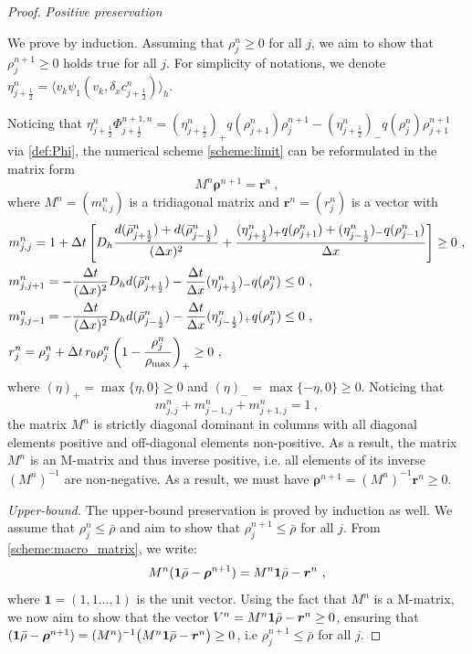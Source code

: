 \documentclass[review,onefignum,onetabnum]{siamart220329}
\newcommand {\dt}   {\Delta t}
\newcommand {\dx}   {\Delta x}
\newcommand{\brho}{\boldsymbol{\rho}}
\newcommand{\br}{\boldsymbol{r}}
\newcommand{\DP}{\color{myblue}}
\begin{document}
\begin{proof}%

\textit{Positive preservation}

We prove by induction. 
Assuming that $\rho_j^n \ge0$ for all $j$, we aim to show that $\rho_j^{n+1} \ge0$ holds true for all $j$.
For simplicity of notations, we denote $\eta_{j+\frac12}^n = \langle v_k \psi_1(v_k, \delta_x c_{j+\frac12}^n)\rangle_h$.

\noindent Noticing that $\eta_{j+\frac12}^n\Phi_{j+\frac12}^{n+1,n}=(\eta_{j+\frac12}^n)_+ q(\rho_{j+1}^n)\rho_j^{n+1} - (\eta_{j+\frac12}^n)_- q(\rho_{j}^n)\rho_{j+1}^{n+1}$ via \cref{def:Phi}, the numerical scheme \cref{scheme:limit} can be reformulated in the matrix form
\begin{equation}\label{scheme:macro_matrix}
    M^n \brho^{n+1} = \br^n\ ,
\end{equation}
where $M^n = (m_{i,j}^n)$ is a {{tridiagonal}} matrix and $\br^n = (r_j^n)$ is a vector with
\begin{align*}
    & m_{j,j}^n = 1 + \dt 
    \left[
    D_h\frac{
    d(\bar{\rho}_{j+\frac12}^n) + d(\bar{\rho}_{j-\frac12}^n)
    }{(\dx)^2} + 
    \frac{
    (\eta_{j+\frac12}^n)_+ q(\rho_{j+1}^n) + (\eta_{j-\frac12}^n)_- q(\rho_{j-1}^n)}{\dx}
    \right] \ge 0\ , \nonumber\\
    & m_{j,j+1}^n = -\frac{\dt}{(\dx)^2} D_h d(\bar{\rho}_{j+\frac12}^n) - \frac{\dt}{\dx} (\eta_{j+\frac12}^n)_- q(\rho_j^n) \le0\ , \nonumber\\
    & m_{j,j-1}^n = -\frac{\dt}{(\dx)^2} D_h d(\bar{\rho}_{j-\frac12}^n) - \frac{\dt}{\dx} (\eta_{j-\frac12}^n)_+ q(\rho_j^n)\le0\ ,\nonumber\\
    & r_j^n = \rho_j^n + \dt \, r_0 \rho_j^{n}\left(1 - \frac{\rho_j^n}{\rho_{\rm max}}\right)_+ \ge 0\ , %
\end{align*}
where $(\eta)_+ = \max\{\eta, 0\}\ge0$ and $(\eta)_-=\max\{-\eta, 0\}\ge0$.
Noticing that 
\begin{equation*}
    m_{j,j}^n + m_{j-1,j}^n + m_{j+1,j}^n = 1\ ,
\end{equation*}
the matrix $M^n$ is strictly diagonal dominant in columns with all diagonal elements positive and off-diagonal elements non-positive. 
As a result, the matrix $M^n$ is an M-matrix and thus inverse positive, i.e. all elements of its inverse $(M^n)^{-1}$ are non-negative. 
As a result, we must have $\brho^{n+1} =(M^n)^{-1}\br^n\ge0$. 

{\DP \textit{Upper-bound.}
The upper-bound preservation is proved by induction as well. We assume that $\rho_j^n \leq \bar{\rho}$ and aim to show that $\rho_j^{n+1} \leq \bar{\rho}$ for all $j$. From \eqref{scheme:macro_matrix}, we write:
$$
    M^n ({\bf 1} \bar{\rho} - \brho^{n+1}) = M^n {\bf 1} \bar{\rho} - \br^n\ ,
$$
where $\textbf{1} = (1,1 \hdots,1)$ is the unit vector. Using the fact that $M^n$ is a M-matrix, we now aim to show that the vector $V^n = M^n {\bf 1} \bar{\rho} - \br^n \geq 0$, ensuring that $({\bf 1} \bar{\rho} - \brho^{n+1}) = (M^n)^{-1} \big(M^n {\bf 1} \bar{\rho} - \br^n \big) \geq 0$, i.e $\rho^{n+1}_j \leq \bar{\rho}$ for all $j$.

}
\end{proof}
\end{document}
